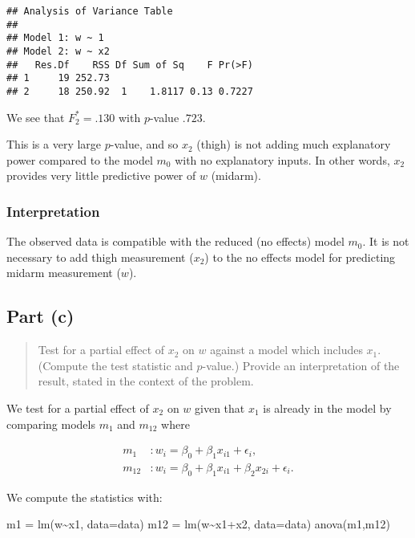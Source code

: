 \documentclass[
]{article}
\newenvironment{Shaded}{\begin{snugshade}}{\end{snugshade}}
\newcommand{\AttributeTok}[1]{\textcolor[rgb]{0.77,0.63,0.00}{#1}}
\newcommand{\FunctionTok}[1]{\textcolor[rgb]{0.00,0.00,0.00}{#1}}
\newcommand{\NormalTok}[1]{#1}
\newcommand{\OtherTok}[1]{\textcolor[rgb]{0.56,0.35,0.01}{#1}}
\newcommand{\SpecialCharTok}[1]{\textcolor[rgb]{0.00,0.00,0.00}{#1}}
\begin{document}
\begin{verbatim}
## Analysis of Variance Table
## 
## Model 1: w ~ 1
## Model 2: w ~ x2
##   Res.Df    RSS Df Sum of Sq    F Pr(>F)
## 1     19 252.73                         
## 2     18 250.92  1    1.8117 0.13 0.7227
\end{verbatim}

We see that \(F^*_2 = .130\) with \(p\)-value \(.723\).

This is a very large \(p\)-value, and so \(x_2\) (thigh) is not adding
much explanatory power compared to the model \(m_0\) with no explanatory
inputs. In other words, \(x_2\) provides very little predictive power of
\(w\) (midarm).

\hypertarget{interpretation}{%
\subsubsection{Interpretation}\label{interpretation}}

The observed data is compatible with the reduced (no effects) model
\(m_0\). It is not necessary to add thigh measurement (\(x_2\)) to the
no effects model for predicting midarm measurement (\(w\)).

\hypertarget{part-c}{%
\subsection{Part (c)}\label{part-c}}

\begin{quote}
Test for a partial effect of \(x_2\) on \(w\) against a model which
includes \(x_1\). (Compute the test statistic and \(p\)-value.) Provide
an interpretation of the result, stated in the context of the problem.
\end{quote}

We test for a partial effect of \(x_2\) on \(w\) given that \(x_1\) is
already in the model by comparing models \(m_1\) and \(m_{1 2}\) where

\begin{align*}
  m_1     &: w_i = \beta_0 + \beta_1 x_{i 1} + \epsilon_i,\\
  m_{1 2} &: w_i = \beta_0 + \beta_1 x_{i 1} + \beta_2 x_{2 i} + \epsilon_i.
\end{align*}

We compute the statistics with:

\begin{Shaded}
\begin{Highlighting}[]
\NormalTok{m1 }\OtherTok{=} \FunctionTok{lm}\NormalTok{(w}\SpecialCharTok{\textasciitilde{}}\NormalTok{x1, }\AttributeTok{data=}\NormalTok{data)}
\NormalTok{m12 }\OtherTok{=} \FunctionTok{lm}\NormalTok{(w}\SpecialCharTok{\textasciitilde{}}\NormalTok{x1}\SpecialCharTok{+}\NormalTok{x2, }\AttributeTok{data=}\NormalTok{data)}
\FunctionTok{anova}\NormalTok{(m1,m12)}
\end{Highlighting}
\end{Shaded}
\end{document}
